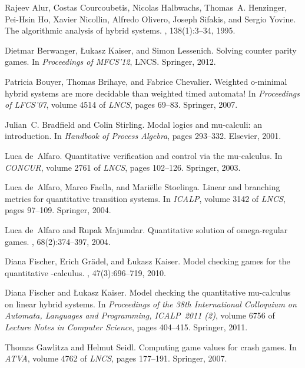 \documentclass[fleqn,envcountsame]{LMCS}
\begin{document}
\begin{thebibliography}{10}

Rajeev Alur, Costas Courcoubetis, Nicolas Halbwachs, Thomas~A. Henzinger,
  Pei-Hsin Ho, Xavier Nicollin, Alfredo Olivero, Joseph Sifakis, and Sergio
  Yovine.
\newblock The algorithmic analysis of hybrid systems.
, 138(1):3--34, 1995.

Dietmar Berwanger, {\L}ukasz Kaiser, and Simon Lessenich.
\newblock Solving counter parity games.
\newblock In {\em Proceedings of MFCS'12}, LNCS. Springer, 2012.

Patricia Bouyer, Thomas Brihaye, and Fabrice Chevalier.
\newblock Weighted o-minimal hybrid systems are more decidable than weighted
  timed automata!
\newblock In {\em Proceedings of LFCS'07}, volume 4514 of {\em LNCS}, pages
  69--83. Springer, 2007.

Julian~C. Bradfield and Colin Stirling.
\newblock Modal logics and mu-calculi: an introduction.
\newblock In {\em Handbook of Process Algebra}, pages 293--332. Elsevier, 2001.

Luca de~Alfaro.
\newblock Quantitative verification and control via the mu-calculus.
\newblock In {\em CONCUR}, volume 2761 of {\em LNCS}, pages 102--126. Springer,
  2003.

Luca de~Alfaro, Marco Faella, and Mari{\"e}lle Stoelinga.
\newblock Linear and branching metrics for quantitative transition systems.
\newblock In {\em ICALP}, volume 3142 of {\em LNCS}, pages 97--109. Springer,
  2004.

Luca de~Alfaro and Rupak Majumdar.
\newblock Quantitative solution of omega-regular games.
, 68(2):374--397, 2004.

Diana Fischer, Erich Gr{\"a}del, and {\L}ukasz Kaiser.
\newblock Model checking games for the quantitative -calculus.
, 47(3):696--719, 2010.

Diana Fischer and {\L}ukasz Kaiser.
\newblock Model checking the quantitative mu-calculus on linear hybrid systems.
\newblock In {\em Proceedings of the 38th International Colloquium on Automata,
  Languages and Programming, ICALP~2011 (2)}, volume 6756 of {\em Lecture Notes
  in Computer Science}, pages 404--415. Springer, 2011.

Thomas Gawlitza and Helmut Seidl.
\newblock Computing game values for crash games.
\newblock In {\em ATVA}, volume 4762 of {\em LNCS}, pages 177--191. Springer,
  2007.


\end{thebibliography}
\end{document}
